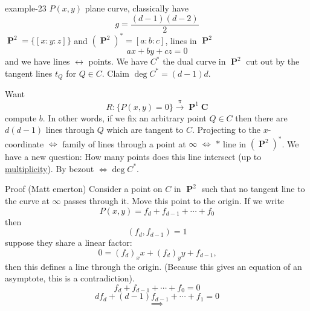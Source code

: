 \documentclass[10pt,]{book}
\numberwithin{equation}{section}
\newcommand{\lb}{[}
\newcommand{\rb}{]}
\newcommand{\CC}{\mathbf{C}}
\DeclareMathOperator{\PP}{\mathbf{P}}
\begin{document}
\begin{example}{}{example-23}%
\hypertarget{p-520}{}%
\(P(x,y)\) plane curve, classically have%
\begin{equation*}
g = \frac{(d-1)(d-2)}{2}
\end{equation*}
\(\PP^2 = \{ \lb x:y:z \rb\}\) and \((\PP^2)^* = \lb a:b:c \rb\), lines in \(\PP^2\)%
\begin{equation*}
ax + by + cz = 0
\end{equation*}
and we have lines \(\leftrightarrow\) points. We have \(C^*\) the dual curve in \(\PP^2\) cut out by the tangent lines \(t_Q\) for \(Q \in C\). Claim \(\deg C^* = (d-1)d\).%
\par
\hypertarget{p-521}{}%
Want%
\begin{equation*}
R:\{P(x,y) = 0\} \xrightarrow\pi \PP^1\CC
\end{equation*}
compute \(b\). In other words, if we fix an arbitrary point \(Q\in C\) then there are \(d(d-1)\) lines through \(Q\) which are tangent to \(C\). Projecting to the \(x\)-coordinate \(\iff\) family of lines through a point at \(\infty\) \(\iff\) \(\ast\) line in \((\PP^2)^*\). We have a new question: How many points does this line intersect (up to \hyperref[def-riem-order-vanish]{multiplicity}). By bezout \(\iff  \deg C^*\).%
\par
\hypertarget{p-522}{}%
Proof (Matt emerton) Consider a point on \(C\) in \(\PP^2\) such that no tangent line to the curve at   \(\infty\) passes through it. Move this point to the origin. If we write%
\begin{equation*}
P(x,y) = f_d + f_{d-1} + \cdots + f_0
\end{equation*}
then%
\begin{equation*}
(f_d, f_{d-1}) = 1
\end{equation*}
suppose they share a linear factor:%
\begin{equation*}
0 = (f_d)_x x + (f_d)_y y + f_{d-1}\text{,}
\end{equation*}
then this defines a line through the origin. (Because this gives an equation of an asymptote, this is a contradiction).%
\begin{equation*}
f_d + f_{d-1} + \cdots + f_0 = 0
\end{equation*}
%
\begin{equation*}
d f_d + (d-1) f_{d-1} + \cdots + f_1 = 0
\end{equation*}
%
\begin{equation*}
\implies
\end{equation*}

\end{example}
\end{document}
